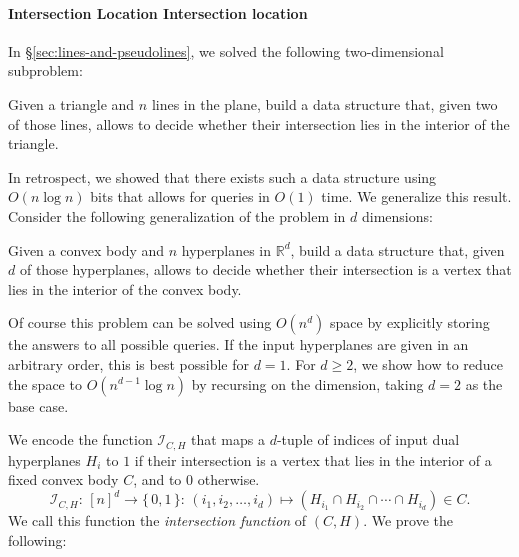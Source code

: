 \paragraph*{\iftitlecase%
Intersection Location\else%
Intersection location\fi}

In \S\ref{sec:lines-and-pseudolines}, we solved the following two-dimensional subproblem:

\begin{problem}
  Given a triangle and \(n\) lines in the plane, build a data structure that,
  given two of those lines, allows to decide whether their intersection
  lies in the interior of the triangle.
\end{problem}

In retrospect, we showed that there exists such a data structure using
\(O(n \log n)\) bits that allows for queries in \(O(1)\) time. We generalize
this result. Consider the following generalization of the problem in
\(d\) dimensions:

\begin{problem}
  Given a convex body and \(n\) hyperplanes in \(\mathbb{R}^d\), build a data
  structure that, given \(d\) of those hyperplanes, allows to decide whether their
  intersection is a vertex that lies in the interior of the convex body.
\end{problem}

Of course this problem can be solved using \(O(n^d)\) space by explicitly
storing the answers to all possible queries. If the input hyperplanes are
given in an arbitrary order, this is best possible for
\(d=1\). For \(d \geq 2\), we show how to reduce the space to \(O(n^{d-1} \log
n)\) by recursing on the dimension, taking \(d = 2\) as the base case.

We encode the function \(\mathcal{I}_{C, H}\)
that maps a \(d\)-tuple of indices of input dual
hyperplanes \(H_i\) to \(1\) if their intersection is a vertex that lies in the
interior of a fixed convex body \(C\), and to \(0\) otherwise.
%
\begin{displaymath}
  \mathcal{I}_{C,H} \colon\, {[n]}^d \to \{\, 0,1\,\} \colon\,
  (i_1,i_2,\ldots,i_d) \mapsto
  (H_{i_1} \cap H_{i_2} \cap \cdots \cap H_{i_d})
  \in  C.
\end{displaymath}
%
We call this function the \emph{intersection function} of \((C,H)\).
%
We prove the following:


